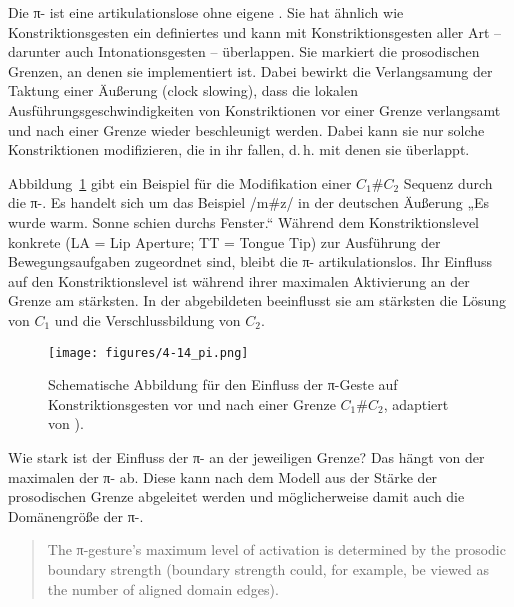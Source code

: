 Die π- ist eine artikulationslose  ohne eigene  \citep{Byrd2003a, Byrd2003b}. Sie hat ähnlich wie Konstriktionsgesten ein  definiertes  und kann mit Konstriktionsgesten aller Art -- darunter auch Intonationsgesten -- überlappen. Sie markiert die prosodischen Grenzen, an denen sie implementiert ist. Dabei bewirkt die Verlangsamung der Taktung einer Äußerung (clock slowing), dass die lokalen Ausführungsgeschwindigkeiten von Konstriktionen vor einer Grenze verlangsamt und nach einer Grenze wieder beschleunigt werden. Dabei kann sie nur solche Konstriktionen modifizieren, die in ihr  fallen, d.\,h. mit denen sie überlappt.

Abbildung~\ref{figure:0415} gibt ein Beispiel für die Modifikation einer ${C}_{1}$\#${C}_{2}$ Sequenz durch die π-. Es handelt sich um das Beispiel /m\#z/ in der deutschen Äußerung „Es wurde warm. Sonne schien durchs Fenster.“ Während dem Konstriktionslevel konkrete  (LA = Lip Aperture; TT = Tongue Tip) zur Ausführung der Bewegungsaufgaben zugeordnet sind, bleibt die π- artikulationslos. Ihr Einfluss auf den Konstriktionslevel ist während ihrer maximalen Aktivierung an der Grenze am stärksten. In der abgebildeten  beeinflusst sie am stärksten die Lösung von ${C}_{1}$ und die Verschlussbildung von ${C}_{2}$. 

\begin{figure}[b]
	\texttt{[image: figures/4-14\_pi.png]}
	\caption{Schematische Abbildung für den Einfluss der π-Geste auf Konstriktionsgesten vor und nach einer Grenze ${C}_{1}$\#${C}_{2}$, adaptiert von \citet[][160]{Byrd2003a}).}
	\label{figure:0415}
\end{figure}

Wie stark ist der Einfluss der π- an der jeweiligen Grenze? Das hängt von der maximalen  der π- ab. Diese  kann nach dem Modell aus der Stärke der prosodischen Grenze abgeleitet werden und möglicherweise damit auch die Domänengröße der π-. 

\newpage 
\begin{quote}
	The π-gesture’s maximum level of activation is determined by the prosodic boundary strength (boundary strength could, for example, be viewed as the number of aligned domain edges). \citep[][160]{Byrd2003a}
\end{quote}


